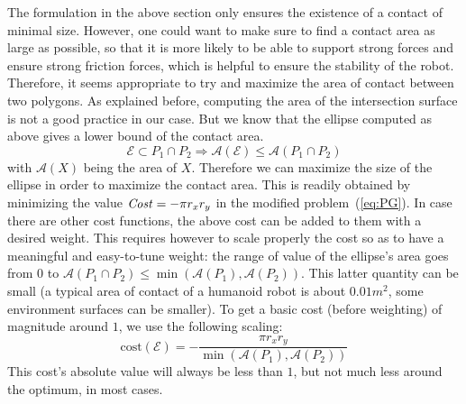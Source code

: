 The formulation in the above section only ensures the existence of a contact of minimal size.
However, one could want to make sure to find a contact area as large as possible, so that it is more likely to be able to support strong forces and ensure strong friction forces, which is helpful to ensure the stability of the robot. Therefore, it seems appropriate to try and maximize the area of contact between two polygons. As explained before, computing the area of the intersection surface is not a good practice in our case. But we know that the ellipse computed as above gives a lower bound of the contact area.
\begin{equation}
\mathcal{E} \subset P_1 \cap P_2 \Longrightarrow  \mathcal{A}(\mathcal{E}) \le \mathcal{A}(P_1 \cap P_2)
\end{equation}
with $\mathcal{A}(X)$ being the area of $X$.\newline
Therefore we can maximize the size of the ellipse in order to maximize the contact area. This is readily obtained by minimizing the value $\mbox{\emph{Cost}} = -\pi r_x r_y$ in the modified problem~(\ref{eq:PG}).
In case there are other cost functions, the above cost can be added to them with a desired weight. This requires however to scale properly the cost so as to have a meaningful and easy-to-tune weight: the range of value of the ellipse's area goes from $0$ to $\mathcal{A}(P_1 \cap P_2) \leq \min (\mathcal{A}(P_1), \mathcal{A}(P_2))$. This latter quantity can be small (a typical area of contact of a humanoid robot is about $0.01m^2$, some environment surfaces can be smaller). To get a basic cost (before weighting) of magnitude around $1$, we use the following scaling:
\begin{equation}
\text{cost}(\mathcal{E}) = - \frac{ \pi r_x r_y}{ \min (\mathcal{A}(P_1), \mathcal{A}(P_2))}
\label{eq:cost-ellipse}
\end{equation}
This cost's absolute value will always be less than $1$, but not much less around the optimum, in most cases.

